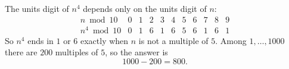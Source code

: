 The units digit of $n^4$ depends only on the units digit of $n$:
\[
\begin{array}{c|cccccccccc}
n\bmod 10&0&1&2&3&4&5&6&7&8&9\\\hline
n^4\bmod 10&0&1&6&1&6&5&6&1&6&1
\end{array}
\]
So $n^4$ ends in $1$ or $6$ exactly when $n$ is not a multiple of $5$. Among $1,\dots,1000$ there are $200$ multiples of $5$, so the answer is
\[
1000-200=\boxed{800}.
\]
